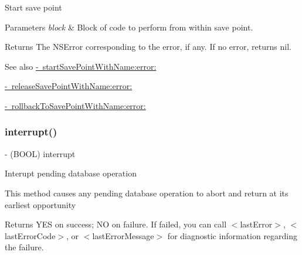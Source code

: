 Start save point


\begin{DoxyParams}{Parameters}
{\em block} & Block of code to perform from within save point.\\
\hline
\end{DoxyParams}
\begin{DoxyReturn}{Returns}
The N\+S\+Error corresponding to the error, if any. If no error, returns {\ttfamily nil}.
\end{DoxyReturn}
\begin{DoxySeeAlso}{See also}
\mbox{\hyperlink{interface_o_p_t_l_y_f_m_d_b_database_a394534a47e9f054edfc63021f2a1ebc3}{-\/ start\+Save\+Point\+With\+Name\+:error\+:}} 

\mbox{\hyperlink{interface_o_p_t_l_y_f_m_d_b_database_afb6f13df41c3e8e1813a00f6d1ec0428}{-\/ release\+Save\+Point\+With\+Name\+:error\+:}} 

\mbox{\hyperlink{interface_o_p_t_l_y_f_m_d_b_database_a8ae3bd5f48fed1f09b14328fc777dab5}{-\/ rollback\+To\+Save\+Point\+With\+Name\+:error\+:}} 
\end{DoxySeeAlso}
\mbox{\label{interface_o_p_t_l_y_f_m_d_b_database_a1aa9233533d16b1fb7b68f272b2d488a}} 
\subsubsection{\texorpdfstring{interrupt()}{interrupt()}}
{\footnotesize\ttfamily -\/ (B\+O\+OL) interrupt \begin{DoxyParamCaption}{ }\end{DoxyParamCaption}}

Interupt pending database operation

This method causes any pending database operation to abort and return at its earliest opportunity

\begin{DoxyReturn}{Returns}
{\ttfamily Y\+ES} on success; {\ttfamily NO} on failure. If failed, you can call {\ttfamily $<$last\+Error$>$}, {\ttfamily $<$last\+Error\+Code$>$}, or {\ttfamily $<$last\+Error\+Message$>$} for diagnostic information regarding the failure. 
\end{DoxyReturn}
\mbox{\label{interface_o_p_t_l_y_f_m_d_b_database_a38f39fc14807b0903098b977d3a04649}} 
